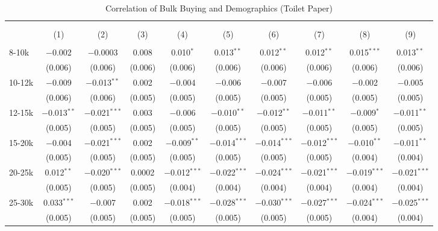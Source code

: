 
\begin{table}[!htbp] \centering 
  \caption{Correlation of Bulk Buying and Demographics (Toilet Paper)} 
  \label{tab:discountingBehavior3625} 
\begin{tabular}{@{\extracolsep{5pt}}lccccccccc} 
\\[-1.8ex]\hline 
\hline \\[-1.8ex] 
\\[-1.8ex] & (1) & (2) & (3) & (4) & (5) & (6) & (7) & (8) & (9)\\ 
\hline \\[-1.8ex] 
 8-10k & $-$0.002 & $-$0.0003 & 0.008 & 0.010$^{*}$ & 0.013$^{**}$ & 0.012$^{**}$ & 0.012$^{**}$ & 0.015$^{***}$ & 0.013$^{**}$ \\ 
  & (0.006) & (0.006) & (0.006) & (0.006) & (0.006) & (0.006) & (0.006) & (0.006) & (0.006) \\ 
  10-12k & $-$0.009 & $-$0.013$^{**}$ & 0.002 & $-$0.004 & $-$0.006 & $-$0.007 & $-$0.006 & $-$0.002 & $-$0.005 \\ 
  & (0.006) & (0.006) & (0.005) & (0.005) & (0.005) & (0.005) & (0.005) & (0.005) & (0.005) \\ 
  12-15k & $-$0.013$^{**}$ & $-$0.021$^{***}$ & 0.003 & $-$0.006 & $-$0.010$^{**}$ & $-$0.012$^{**}$ & $-$0.011$^{**}$ & $-$0.009$^{*}$ & $-$0.011$^{**}$ \\ 
  & (0.005) & (0.005) & (0.005) & (0.005) & (0.005) & (0.005) & (0.005) & (0.005) & (0.005) \\ 
  15-20k & $-$0.004 & $-$0.021$^{***}$ & 0.002 & $-$0.009$^{**}$ & $-$0.014$^{***}$ & $-$0.014$^{***}$ & $-$0.012$^{***}$ & $-$0.010$^{**}$ & $-$0.011$^{**}$ \\ 
  & (0.005) & (0.005) & (0.005) & (0.005) & (0.005) & (0.005) & (0.005) & (0.004) & (0.004) \\ 
  20-25k & 0.012$^{**}$ & $-$0.020$^{***}$ & 0.0002 & $-$0.012$^{***}$ & $-$0.022$^{***}$ & $-$0.024$^{***}$ & $-$0.021$^{***}$ & $-$0.019$^{***}$ & $-$0.021$^{***}$ \\ 
  & (0.005) & (0.005) & (0.005) & (0.004) & (0.004) & (0.004) & (0.004) & (0.004) & (0.004) \\ 
  25-30k & 0.033$^{***}$ & $-$0.007 & 0.002 & $-$0.018$^{***}$ & $-$0.028$^{***}$ & $-$0.030$^{***}$ & $-$0.027$^{***}$ & $-$0.024$^{***}$ & $-$0.025$^{***}$ \\ 
  & (0.005) & (0.005) & (0.005) & (0.005) & (0.005) & (0.005) & (0.005) & (0.004) & (0.004) \\ 

\end{tabular}
\end{table}
